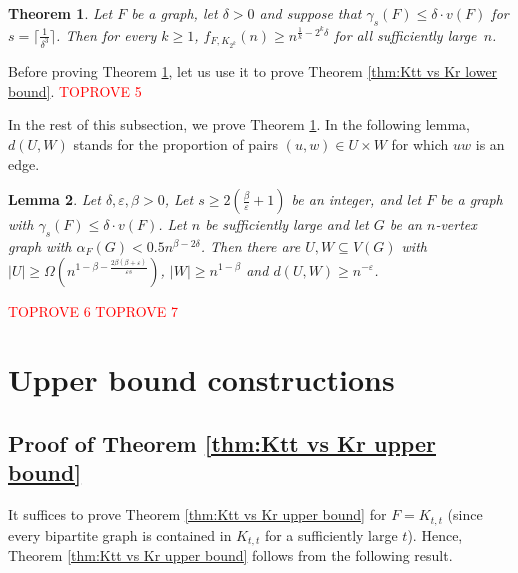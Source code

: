 \documentclass[11pt]{article}
\let\oldendproof\endproof
\renewenvironment{proof}[1][\proofname]{\oldproof[\bf #1]}{\oldendproof}
\theoremstyle{plain}
\newtheorem{theorem}{Theorem}[section]
\newtheorem{lemma}[theorem]{Lemma}
\theoremstyle{definition}
\begin{document}
    \begin{theorem}\label{thm:clique vs Ktt} 
       Let $F$ be a graph, let $\delta > 0$ and suppose that $\gamma_s(F) \leq \delta \cdot v(F)$ for $s = \lceil \frac{1}{\delta^3}\rceil$.
       Then for every $k \geq 1$, 
       $f_{F,K_{2^k}}(n) \geq n^{\frac{1}{k} - 2^k\delta}$ for all sufficiently large~$n$.
	\end{theorem}
    Before proving Theorem \ref{thm:clique vs Ktt}, let us use it to prove Theorem \ref{thm:Ktt vs Kr lower bound}.
    \begin{proof}\textcolor{red}{TOPROVE 5}\end{proof}
    
    In the rest of this subsection, we prove Theorem \ref{thm:clique vs Ktt}.
	In the following lemma, $d(U,W)$ stands for the proportion of pairs $(u,w)\in U\times W$ for which $uw$ is an edge.
	\begin{lemma}\label{lem:main}
		Let $\delta,\varepsilon,\beta > 0$, Let $s \geq 2(\frac{\beta}{\varepsilon} + 1)$ be an integer, and let $F$ be a graph with $\gamma_s(F) \leq \delta \cdot v(F)$.
		Let $n$ be sufficiently large and let $G$ be an $n$-vertex graph with $\alpha_F(G) < 0.5n^{\beta-2\delta}$. Then there are 
		$U,W \subseteq V(G)$ with $|U| \geq \Omega(n^{1-\beta - \frac{2\beta(\beta+\varepsilon)}{\varepsilon s}})$, $|W| \geq n^{1-\beta}$ and $d(U,W) \geq n^{-\varepsilon}$. 
	\end{lemma} 
	\begin{proof}\textcolor{red}{TOPROVE 6}\end{proof}
	\begin{proof}\textcolor{red}{TOPROVE 7}\end{proof}



 

\section{Upper bound constructions} \label{sec:construction}

\subsection{Proof of Theorem \ref{thm:Ktt vs Kr upper bound}}
It suffices to prove Theorem \ref{thm:Ktt vs Kr upper bound} for $F = K_{t,t}$ (since every bipartite graph is contained in $K_{t,t}$ for a sufficiently large $t$). Hence, Theorem \ref{thm:Ktt vs Kr upper bound} follows from the following result.
\end{document}
